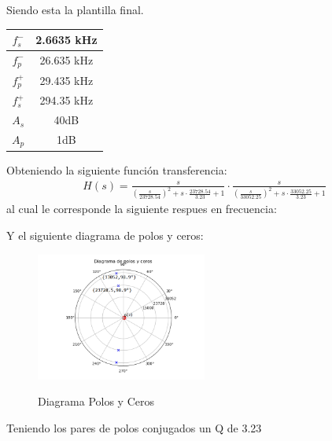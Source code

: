 Siendo esta la plantilla final.
\begin{table}[H]
\centering
\begin{tabular}{|c|c|}
\hline
$f_s^-$      & 2.6635 kHz          \\ \hline
$f_p^-$      & 26.635 kHz         \\ \hline
$f_p^+$      & 29.435 kHz           \\ \hline
$f_s^+$      & 294.35 kHz          \\ \hline
$A_s$      & 40dB           \\ \hline
$A_p$      & 1dB               \\ \hline
\end{tabular}
\end{table}
Obteniendo la siguiente función transferencia:
\begin{align}
	H(s)=\frac{s}{\left( \frac{s}{23728.54}\right) ^2+s\cdot \frac{23728.54}{3.23}+1}\cdot \frac{s}{\left( \frac{s}{33052.25} \right)^2+s\cdot \frac{33052.25}{3.23}+1}
\end{align}
al cual le corresponde la siguiente respues en frecuencia:

Y el siguiente diagrama de polos y ceros:
\begin{figure}[H]
	\centering
	\includegraphics[width=0.5\textwidth]{Imagenes-Ej2/DiagramaPolosYCeros.png}
	\label{fig:stepresponse}
	\caption{Diagrama Polos y Ceros}
\end{figure}

Teniendo los pares de polos conjugados un Q de 3.23	


